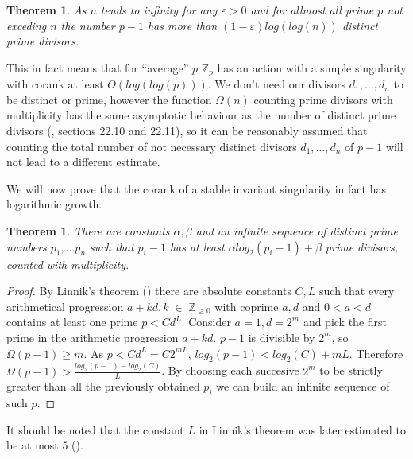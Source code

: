 \documentclass{amsart}
\newtheorem{theorem}[subsection]{Theorem}
\begin{document}
 \begin{theorem}
 
 As $n$ tends to infinity for any $\varepsilon>0$ and for allmost all prime $p$ not exceding $n$ the number $p-1$ has more than $(1-\varepsilon)log(log(n))$ distinct prime divisors.
 
 
 
 \end{theorem}

This in fact means that for ``average'' $p$ $\mathbb{Z}_p$ has an action with a simple singularity with corank at least $O(log(log(p)))$. We don't need our divisors $d_1, \ldots , d_n$ to be distinct or prime, however the function $\Omega(n)$ counting prime divisors with multiplicity has the same asymptotic behaviour as the number of distinct prime divisors (\cite{13}, sections 22.10 and 22.11), so it can be reasonably assumed that counting the total number of not necessary distinct divisors $d_1, \ldots, d_n$ of $p-1$ will not lead to a different estimate.

We will now prove that the corank of a stable invariant singularity in fact has logarithmic growth.

\begin{theorem}There are constants $\alpha, \beta$ and an infinite sequence of distinct prime numbers $p_1, \ldots p_n$ such that $p_i - 1$ has at least $\alpha log_2 (p_i - 1) + \beta$ prime divisors, counted with multiplicity.

\end{theorem}

\begin{proof}

By Linnik's theorem (\cite{14}) there are absolute constants $C, L$ such that every arithmetical progression $a + kd, k \; \in \; \mathbb{Z}_{\geq 0}$ with coprime $a, d$ and $0<a<d$ contains at least one prime $p < C d^L$. Consider $a=1, d= 2^m$ and pick the first prime in the arithmetic progression $a + kd$. $p-1$ is divisible by $2^m$, so $\Omega(p-1) \geq m$. As $p < C d^L = C 2^{mL}$, $log_2 (p-1) < log_2(C) + mL$. Therefore $\Omega(p-1) >\frac{ log_2 (p-1) - log_2 (C)}{L}$.  By choosing each succesive $2^m$ to be strictly greater than all the previously obtained $p_i$ we can build an infinite sequence of such $p$.

\end{proof}

It should be noted that the constant $L$ in Linnik's theorem was later estimated to be at most $5$ (\cite{15}).
\end{document}
